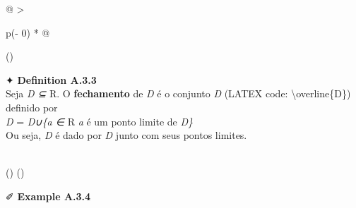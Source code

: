 \documentclass[
]{article}
\begin{document}
\begin{longtable}[]{@{}
  >{\raggedright\arraybackslash}p{(\columnwidth - 0\tabcolsep) * }@{}}
\toprule()
\begin{minipage}[b]{\linewidth}\raggedright
✦ \textbf{Definition A.3.3}\\
Seja \emph{D ⊆} R. O \textbf{fechamento} de \emph{D} é o conjunto
\emph{D} (LATEX code: \textbackslash overline\{D\}) definido por\\
\emph{D} = \emph{D∪\{a ∈} R \emph{\textbar{} a} é um ponto limite de
\emph{D\}}\\
Ou seja, \emph{D} é dado por \emph{D} junto com seus pontos
limites.\strut
\end{minipage} \\
\midrule()
\endhead
\bottomrule()
\end{longtable}

✐ \textbf{Example A.3.4}
\end{document}
